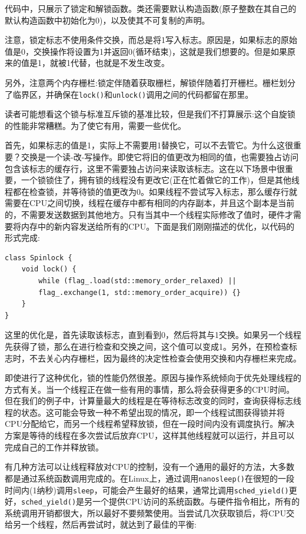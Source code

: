 代码中，只展示了锁定和解锁函数。类还需要默认构造函数(原子整数在其自己的默认构造函数中初始化为0)，以及使其不可复制的声明。

注意，锁定标志不使用条件交换，而总是将1写入标志。原因是，如果标志的原始值是0，交换操作将设置为1并返回0(循环结束)，这就是我们想要的。但是如果原来的值是1，就被1代替，也就是不发生改变。

另外，注意两个内存栅栏:锁定伴随着获取栅栏，解锁伴随着打开栅栏。栅栏划分了临界区，并确保在\texttt{lock()}和\texttt{unlock()}调用之间的代码都留在那里。

读者可能想看这个锁与标准互斥锁的基准比较，但是我们不打算展示:这个自旋锁的性能非常糟糕。为了使它有用，需要一些优化。

首先，如果标志的值是1，实际上不需要用1替换它，可以不去管它。为什么这很重要？交换是一个读-改-写操作。即使它将旧的值更改为相同的值，也需要独占访问包含该标志的缓存行，这里不需要独占访问来读取该标志。这在以下场景中很重要，一个锁锁住了，拥有锁的线程没有更改它(正在忙着做它的工作)，但是其他线程都在检查锁，并等待锁的值更改为0。如果线程不尝试写入标志，那么缓存行就需要在CPU之间切换，线程在缓存中都有相同的内存副本，并且这个副本是当前的，不需要发送数据到其他地方。只有当其中一个线程实际修改了值时，硬件才需要将内存中的新内容发送给所有的CPU。下面是我们刚刚描述的优化，以代码的形式完成:

\begin{lstlisting}[style=styleCXX]
class Spinlock {
	void lock() {
		while (flag_.load(std::memory_order_relaxed) ||
		flag_.exchange(1, std::memory_order_acquire)) {}
	}
}
\end{lstlisting}

这里的优化是，首先读取该标志，直到看到0，然后将其与1交换。如果另一个线程先获得了锁，那么在进行检查和交换之间，这个值可以变成1。另外，在预检查标志时，不去关心内存栅栏，因为最终的决定性检查会使用交换和内存栅栏来完成。

即使进行了这种优化，锁的性能仍然很差。原因与操作系统倾向于优先处理线程的方式有关。当一个线程正在做一些有用的事情，那么将会获得更多的CPU时间。但在我们的例子中，计算量最大的线程是在等待标志改变的同时，查询获得标志线程的状态。这可能会导致一种不希望出现的情况，即一个线程试图获得锁并将CPU分配给它，而另一个线程希望释放锁，但在一段时间内没有调度执行。解决方案是等待的线程在多次尝试后放弃CPU，这样其他线程就可以运行，并且可以完成自己的工作并释放锁。

有几种方法可以让线程释放对CPU的控制，没有一个通用的最好的方法，大多数都是通过系统函数调用完成的。在Linux上，通过调用\texttt{nanosleep()}在很短的一段时间内(1纳秒)调用\texttt{sleep}，可能会产生最好的结果，通常比调用\texttt{sched\_yield()}更好，\texttt{sched\_yield()}是另一个提供CPU访问的系统函数。与硬件指令相比，所有的系统调用开销都很大，所以最好不要频繁使用。当尝试几次获取锁后，将CPU交给另一个线程，然后再尝试时，就达到了最佳的平衡:

